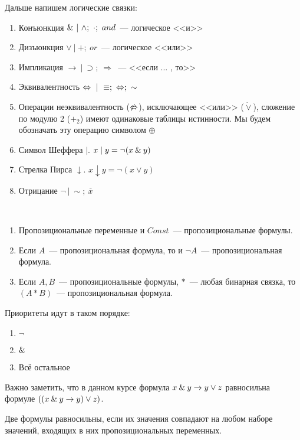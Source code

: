 \documentclass[main]{subfiles}
\begin{document}
Дальше напишем логические связки:
\begin{enumerate}
    \item Конъюнкция $\and\ |\ \land;\ \cdot;\ and $~--- логическое <<и>>
    \item Дизъюнкция $\lor\ |\ +;\ or$~---  логическое <<или>>
    \item Импликация $\to\ |\ \supset;\ \Rightarrow$~--- <<если ... , то>>
    \item Эквивалентность $\lra\ |\ \equiv;\ \lra;\ \sim$
    \item Операции неэквивалентность ($\not\Leftrightarrow$), исключающее <<или>> ($\dot{\lor}$), сложение по модулю 2 ($+_2$) имеют одинаковые таблицы истинности. Мы будем обозначать эту операцию символом $\oplus$
    \item Символ Шеффера $ \mid$.   $x\mid y = \lnot(x\mathbin{\&} y)$
    \item Стрелка Пирса $\downarrow$.   $x\downarrow y = \lnot(x\lor y)$
    \item Отрицание $\lnot\ |\ \sim;\ \overline{x}$
\end{enumerate}
\begin{definition}
    \

    \begin{enumerate}
        \item Пропозициональные переменные и $Const$~--- пропозициональные формулы.
        \item Если $A$~--- пропозициональная формула, то и $\lnot A$~--- пропозициональная формула.
        \item Если $A, B$~--- пропозициональные формулы, $*$~--- любая бинарная связка, то $(A * B)$~--- пропозициональная формула.
    \end{enumerate}
\end{definition}
Приоритеты идут в таком порядке:
\begin{enumerate}
    \item $\lnot$
    \item $\mathbin{\&}$
    \item Всё остальное
\end{enumerate}
\begin{remark}
    Важно заметить, что в данном курсе формула $x\mathbin{\&} y \to y\lor z$ равносильна формуле $((x\mathbin{\&} y \to y) \lor z)$.
\end{remark}
\begin{definition}
    Две формулы равносильны, если их значения совпадают на любом наборе значений, входящих в них пропозициональных переменных.
\end{definition}
\end{document}
